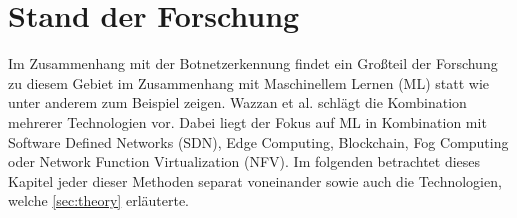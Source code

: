 \section{Stand der Forschung}
\label{sec:research}

Im Zusammenhang mit der Botnetzerkennung findet ein Großteil der Forschung zu diesem Gebiet im Zusammenhang mit Maschinellem Lernen (ML) statt wie
unter anderem zum Beispiel \cite{SAlrayes2022ModelingOB,DBLP:journals/comcom/Alani22,Habtamu2022ASR} zeigen.
Wazzan et al. \cite{Wazzan2021InternetOT} schlägt die Kombination mehrerer Technologien vor. Dabei liegt der Fokus auf ML in Kombination mit 
Software Defined Networks (SDN), Edge Computing, Blockchain, Fog Computing oder Network Function Virtualization (NFV). Im folgenden 
betrachtet dieses Kapitel jeder dieser Methoden separat voneinander sowie auch die Technologien, welche \ref{sec:theory} erläuterte.